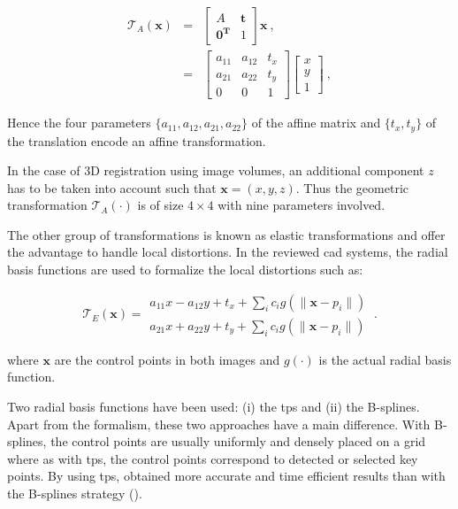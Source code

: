 \begin{eqnarray}
  \mathcal{T}_A(\mathbf{x}) & = & \begin{bmatrix}
    A & \mathbf{t} \\
    \mathbf{0^T} & 1
  \end{bmatrix} \mathbf{x} \ , \nonumber \\
  & = & \begin{bmatrix}
    a_{11} & a_{12} & t_x \\
    a_{21} & a_{22} & t_y \\
    0 & 0 & 1
  \end{bmatrix}\begin{bmatrix}
    x \\
    y \\
    1
  \end{bmatrix} \ , \label{eq:afftra}
\end{eqnarray}

Hence the four parameters $\{a_{11},a_{12},a_{21},a_{22}\}$ of the affine matrix and $\{ t_x, t_y \}$ of the translation encode an affine transformation.

In the case of 3D registration using image volumes, an additional component $z$ has to be taken into account such that $\mathbf{x} = (x,y,z)$. Thus the geometric transformation $\mathcal{T}_A(\cdot)$ is of size $4 \times 4$ with nine parameters involved.

The other group of transformations is known as elastic transformations and offer the advantage to handle local distortions. In the reviewed \ac{cad} systems, the radial basis functions are used to formalize the local distortions such as:

\begin{equation}
  \mathcal{T}_E(\mathbf{x}) = \begin{matrix}
    a_{11} x - a_{12} y + t_x + \sum_i c_i g(\| \mathbf{x} - p_i \|) \\
    a_{21} x + a_{22} y + t_y + \sum_i c_i g(\| \mathbf{x} - p_i \|)
  \end{matrix} \ .
\end{equation}

\noindent where $\mathbf{x}$ are the control points in both images and $g(\cdot)$ is the actual radial basis function. 

Two radial basis functions have been used: (i) the \ac{tps} and (ii) the B-splines. Apart from the formalism, these two approaches have a main difference. With B-splines, the control points are usually uniformly and densely placed on a grid where as with \ac{tps}, the control points correspond to detected or selected key points. By using \ac{tps}, \cite{Mitra2011} obtained more accurate and time efficient results than with the B-splines strategy (\cite{Mitra2012a}).

